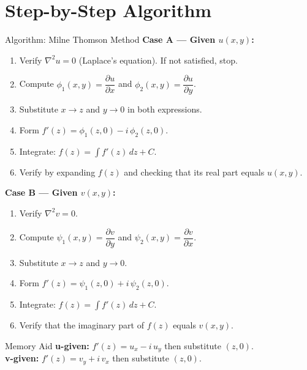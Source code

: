 \documentclass[12pt,a4paper]{article}
\begin{document}
\section{Step-by-Step Algorithm}

\begin{infobox}{Algorithm: Milne Thomson Method}
\textbf{Case A --- Given \( u(x,y) \):}
\begin{enumerate}[label=\textbf{Step \arabic*.}]
  \item Verify \( \nabla^2 u = 0 \) (Laplace's equation). If not satisfied, stop.
  \item Compute \( \phi_1(x,y) = \dfrac{\partial u}{\partial x} \) and \( \phi_2(x,y) = \dfrac{\partial u}{\partial y} \).
  \item Substitute \( x \to z \) and \( y \to 0 \) in both expressions.
  \item Form \( f'(z) = \phi_1(z,0) - i\,\phi_2(z,0) \).
  \item Integrate: \( f(z) = \displaystyle\int f'(z)\,dz + C \).
  \item Verify by expanding \( f(z) \) and checking that its real part equals \( u(x,y) \).
\end{enumerate}

\vspace{4pt}
\textbf{Case B --- Given \( v(x,y) \):}
\begin{enumerate}[label=\textbf{Step \arabic*.}]
  \item Verify \( \nabla^2 v = 0 \).
  \item Compute \( \psi_1(x,y) = \dfrac{\partial v}{\partial y} \) and \( \psi_2(x,y) = \dfrac{\partial v}{\partial x} \).
  \item Substitute \( x \to z \) and \( y \to 0 \).
  \item Form \( f'(z) = \psi_1(z,0) + i\,\psi_2(z,0) \).
  \item Integrate: \( f(z) = \displaystyle\int f'(z)\,dz + C \).
  \item Verify that the imaginary part of \( f(z) \) equals \( v(x,y) \).
\end{enumerate}
\end{infobox}

\begin{learnbox}{Memory Aid}
\textbf{u-given:} \( f'(z) = u_x - i\,u_y \) then substitute \( (z,0) \).\\
\textbf{v-given:} \( f'(z) = v_y + i\,v_x \) then substitute \( (z,0) \).
\end{learnbox}
\end{document}
